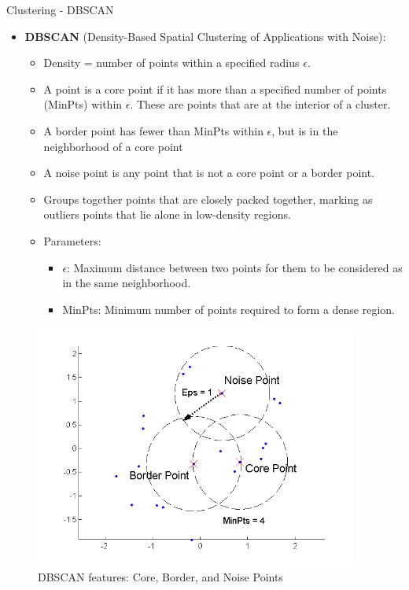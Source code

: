\begin{frame}[allowframebreaks]{Clustering - DBSCAN}
\begin{itemize}
    \item \textbf{DBSCAN} (Density-Based Spatial Clustering of Applications with Noise):
    \begin{itemize}
        \item Density = number of points within a specified radius $\epsilon$.
        \item A point is a core point if it has more than a specified number of points (MinPts) within $\epsilon$. These are points that are at the interior of a cluster.
        \item A border point has fewer than MinPts within $\epsilon$, but is in the neighborhood of a core point
        \item A noise point is any point that is not a core point or a border point.
        \item Groups together points that are closely packed together, marking as outliers points that lie alone in low-density regions.
        \item Parameters:
        \begin{itemize}
            \item $\epsilon$: Maximum distance between two points for them to be considered as in the same neighborhood.
            \item MinPts: Minimum number of points required to form a dense region.
        \end{itemize}
    \end{itemize}
\end{itemize}

\framebreak

\begin{figure}
    \centering
    \includegraphics[width=0.95\textwidth,height=0.8\textheight,keepaspectratio]{images/dul/dbscan/dbscan-features.png}
    \caption{DBSCAN features: Core, Border, and Noise Points}
\end{figure}
\end{frame}


